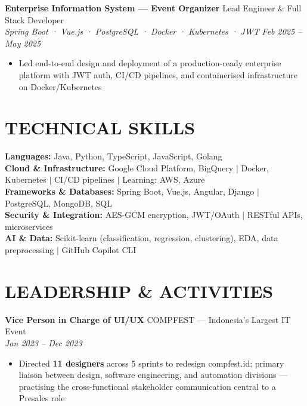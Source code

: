 \documentclass[10pt,a4paper]{article}
\newcommand{\experienceheader}[4]{
    \textbf{#1} \hfill #2 \\
    \textit{#3} \hfill \textit{#4}
}
\begin{document}
\vspace{2pt}

\experienceheader{Enterprise Information System --- Event Organizer}{Lead Engineer \& Full Stack Developer}{Spring Boot · Vue.js · PostgreSQL · Docker · Kubernetes · JWT}{Feb 2025 -- May 2025}
\begin{itemize}[leftmargin=*, itemsep=0.5pt, topsep=1pt]
    \item Led end-to-end design and deployment of a production-ready enterprise platform with JWT auth, CI/CD pipelines, and containerised infrastructure on Docker/Kubernetes
\end{itemize}

\vspace{-4pt}

\section*{TECHNICAL SKILLS}

\textbf{Languages:} Java, Python, TypeScript, JavaScript, Golang \\
\textbf{Cloud \& Infrastructure:} Google Cloud Platform, BigQuery $|$ Docker, Kubernetes $|$ CI/CD pipelines $|$ Learning: AWS, Azure \\
\textbf{Frameworks \& Databases:} Spring Boot, Vue.js, Angular, Django $|$ PostgreSQL, MongoDB, SQL \\
\textbf{Security \& Integration:} AES-GCM encryption, JWT/OAuth $|$ RESTful APIs, microservices \\
\textbf{AI \& Data:} Scikit-learn (classification, regression, clustering), EDA, data preprocessing $|$ GitHub Copilot CLI

\vspace{-4pt}

\section*{LEADERSHIP \& ACTIVITIES}

\experienceheader{Vice Person in Charge of UI/UX}{COMPFEST --- Indonesia's Largest IT Event}{}{Jan 2023 -- Dec 2023}
\begin{itemize}[leftmargin=*, itemsep=0.5pt, topsep=1pt]
    \item Directed \textbf{11 designers} across 5 sprints to redesign compfest.id; primary liaison between design, software engineering, and automation divisions --- practising the cross-functional stakeholder communication central to a Presales role
\end{itemize}
\end{document}
